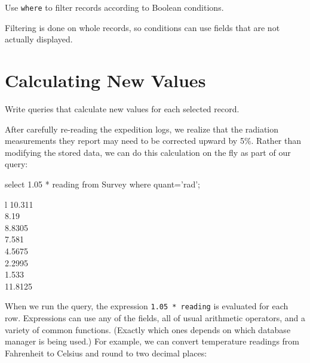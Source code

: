\begin{keypoints}
\begin{swcitemize}
\item
  Use \texttt{where} to filter records according to Boolean conditions.
\item
  Filtering is done on whole records, so conditions can use fields that
  are not actually displayed.
\end{swcitemize}
\end{keypoints}

\section{Calculating New Values}

\begin{objectives}
\begin{swcitemize}
\item
  Write queries that calculate new values for each selected record.
\end{swcitemize}
\end{objectives}

After carefully re-reading the expedition logs, we realize that the
radiation measurements they report may need to be corrected upward by
5\%. Rather than modifying the stored data, we can do this calculation
on the fly as part of our query:

\begin{VerbIn}
select 1.05 * reading from Survey where quant='rad';
\end{VerbIn}

\begin{sqltable}{l}
10.311 \\
8.19 \\
8.8305 \\
7.581 \\
4.5675 \\
2.2995 \\
1.533 \\
11.8125 \\
\end{sqltable}

When we run the query, the expression \texttt{1.05 * reading} is
evaluated for each row. Expressions can use any of the fields, all of
usual arithmetic operators, and a variety of common functions. (Exactly
which ones depends on which database manager is being used.) For
example, we can convert temperature readings from Fahrenheit to Celsius
and round to two decimal places:

